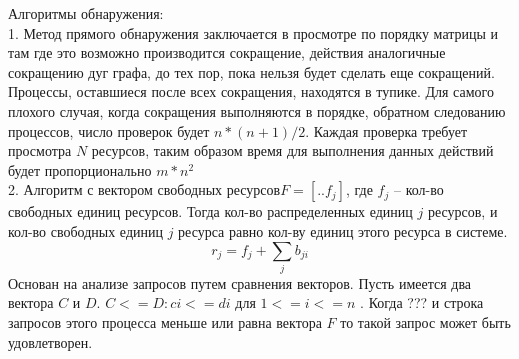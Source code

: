 Алгоритмы обнаружения:\\
1. Метод прямого обнаружения заключается в просмотре по порядку матрицы и там где это возможно производится сокращение, действия аналогичные сокращению дуг графа, до тех пор, пока нельзя будет сделать еще сокращений. Процессы, оставшиеся после всех сокращения, находятся в тупике. Для самого плохого случая, когда сокращения выполняются в порядке, обратном следованию процессов, число проверок будет $n * (n + 1) /2$. Каждая проверка требует просмотра $N$  ресурсов, таким образом время для выполнения данных действий будет пропорционально  $m * n^2$\\
2. Алгоритм с вектором свободных ресурсов$ F = [..f_j]$, где $f_j$ – кол-во свободных единиц ресурсов. Тогда кол-во распределенных единиц $j$ ресурсов, и кол-во свободных единиц $j$ ресурса равно кол-ву единиц этого ресурса в системе. $$r_j = f_j + \sum\limits_{j} b_{ji}$$
Основан на анализе запросов путем сравнения векторов. Пусть имеется два вектора $C$ и $D$. $C <= D : ci <= di$ для $1 <= i <= n$ . Когда ??? и строка запросов этого процесса меньше или равна вектора $F$ то такой запрос может быть удовлетворен.